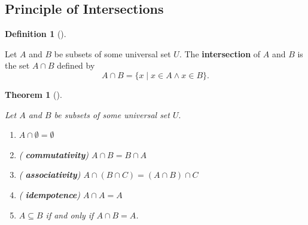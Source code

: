 \documentclass[
  letterpaper,
  10pt,
  reqno,
  twopage,
  openany]{book}
\providecommand{\tightlist}{%
  \setlength{\itemsep}{0pt}\setlength{\parskip}{0pt}}\usepackage{longtable,booktabs,array}
\theoremstyle{plain}
\theoremstyle{definition}
\theoremstyle{definition}
\newtheorem{definition}{Definition}[chapter]
\theoremstyle{definition}
\theoremstyle{plain}
\theoremstyle{plain}
\newtheorem{theorem}{Theorem}[chapter]
\theoremstyle{remark}
\begin{document}
\hypertarget{principle-of-intersections}{%
\subsection{Principle of
Intersections}\label{principle-of-intersections}}

\leavevmode{}%
\begin{definition}[]\label{def-intersection}

Let \(A\) and \(B\) be subsets of some universal set \(U.\) The
 \textbf{intersection} of \(A\) and \(B\) is the set
\(A\cap B\) defined by \[
A\cap B =\{x\mid x\in A \land x\in B\}.
\]

\end{definition}

\leavevmode{}%
\begin{theorem}[]\label{thm-set-intersection}

Let \(A\) and \(B\) be subsets of some universal set \(U.\)

\begin{enumerate}
\def\labelenumi{\arabic{enumi}.}
\tightlist
\item
  \(A\cap \emptyset =\emptyset\)
\item
  ( \textbf{commutativity}) \(A\cap B=B\cap A\)
\item
  ( \textbf{associativity})
  \(A\cap (B \cap C) =(A\cap B)\cap C\)
\item
  ( \textbf{idempotence}) \(A \cap A =A\)
\item
  \(A\subseteq B\) if and only if \(A\cap B=A\).
\end{enumerate}

\end{theorem}
\end{document}
